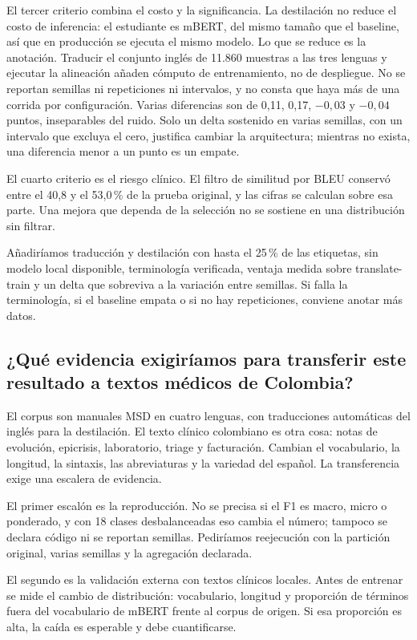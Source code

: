 El tercer criterio combina el costo y la significancia. La destilación no reduce el costo de inferencia: el estudiante es mBERT, del mismo tamaño que el baseline, así que en producción se ejecuta el mismo modelo. Lo que se reduce es la anotación. Traducir el conjunto inglés de 11.860 muestras a las tres lenguas y ejecutar la alineación añaden cómputo de entrenamiento, no de despliegue. No se reportan semillas ni repeticiones ni intervalos, y no consta que haya más de una corrida por configuración. Varias diferencias son de 0,11, 0,17, $-0{,}03$ y $-0{,}04$ puntos, inseparables del ruido. Solo un delta sostenido en varias semillas, con un intervalo que excluya el cero, justifica cambiar la arquitectura; mientras no exista, una diferencia menor a un punto es un empate.

El cuarto criterio es el riesgo clínico. El filtro de similitud por BLEU conservó entre el 40,8 y el 53,0\,\% de la prueba original, y las cifras se calculan sobre esa parte. Una mejora que dependa de la selección no se sostiene en una distribución sin filtrar.

Añadiríamos traducción y destilación con hasta el 25\,\% de las etiquetas, sin modelo local disponible, terminología verificada, ventaja medida sobre translate-train y un delta que sobreviva a la variación entre semillas. Si falla la terminología, si el baseline empata o si no hay repeticiones, conviene anotar más datos.

\subsection{¿Qué evidencia exigiríamos para transferir este resultado a textos médicos de Colombia?}

El corpus son manuales MSD en cuatro lenguas, con traducciones automáticas del inglés para la destilación. El texto clínico colombiano es otra cosa: notas de evolución, epicrisis, laboratorio, triage y facturación. Cambian el vocabulario, la longitud, la sintaxis, las abreviaturas y la variedad del español. La transferencia exige una escalera de evidencia.

El primer escalón es la reproducción. No se precisa si el F1 es macro, micro o ponderado, y con 18 clases desbalanceadas eso cambia el número; tampoco se declara código ni se reportan semillas. Pediríamos reejecución con la partición original, varias semillas y la agregación declarada.

El segundo es la validación externa con textos clínicos locales. Antes de entrenar se mide el cambio de distribución: vocabulario, longitud y proporción de términos fuera del vocabulario de mBERT frente al corpus de origen. Si esa proporción es alta, la caída es esperable y debe cuantificarse.

